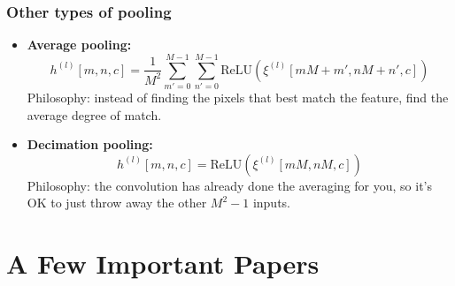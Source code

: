 \documentclass{beamer}
\begin{document}
\begin{frame}
  \frametitle{Other types of pooling}
  \begin{itemize}
  \item {\bf Average pooling:}
    \begin{displaymath}
      h^{(l)}[m,n,c] = \frac{1}{M^2}\sum_{m'=0}^{M-1}\sum_{n'=0}^{M-1} \mbox{ReLU}\left(\xi^{(l)}[mM+m',nM+n',c]\right)
    \end{displaymath}
    Philosophy: instead of finding the pixels that best match the feature,
    find the average degree of match.
  \item {\bf Decimation pooling:}
    \begin{displaymath}
      h^{(l)}[m,n,c] = \mbox{ReLU}\left(\xi^{(l)}[mM,nM,c]\right)
    \end{displaymath}
    Philosophy: the convolution has already done the averaging for you, so
    it's OK to just  throw away the other $M^2-1$ inputs.
  \end{itemize}
\end{frame}

\section[Papers]{A Few Important Papers}
\setcounter{subsection}{1}
\end{document}
